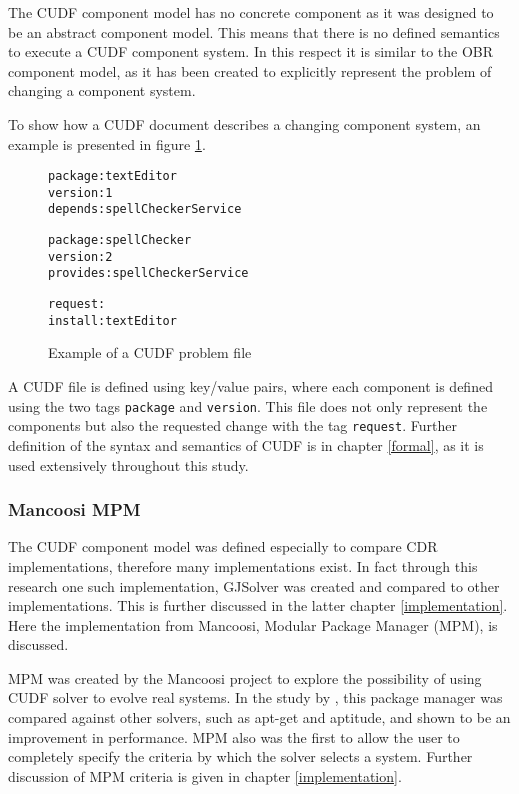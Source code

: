 The CUDF component model has no concrete component as it was designed to be an abstract component model.
This means that there is no defined semantics to execute a CUDF component system.
In this respect it is similar to the OBR component model, as it has been created to explicitly represent the problem of changing a component system.

To show how a CUDF document describes a changing component system, an example is presented in figure \ref{CUDFmetadata}.

\begin{figure}[htp] 
\begin{center}
\begin{alltt}
package: textEditor
version: 1
depends: spellCheckerService

package: spellChecker
version: 2
provides: spellCheckerService

request:
install:textEditor

\end{alltt}
  \caption[CUDF meta-data file]{Example of a CUDF problem file}
  \label{CUDFmetadata}
\end{center}
\end{figure}

A CUDF file is defined using key/value pairs, where each component is defined using the two tags \texttt{package} and \texttt{version}.
This file does not only represent the components but also the requested change with the tag \texttt{request}.
Further definition of the syntax and semantics of CUDF is in chapter \ref{formal}, as it is used extensively throughout this study.

\subsubsection{Mancoosi MPM}
The CUDF component model was defined especially to compare CDR implementations, therefore many implementations exist.
In fact through this research one such implementation, GJSolver was created and compared to other implementations.
This is further discussed in the latter chapter \ref{implementation}.
Here the implementation from Mancoosi, Modular Package Manager \citep{abate2011} (MPM), is discussed.

MPM was created by the Mancoosi project to explore the possibility of using CUDF solver to evolve real systems.
In the study by \cite{abate2011}, this package manager was compared against other solvers, such as apt-get and aptitude, and shown to be an improvement in performance.
MPM also was the first to allow the user to completely specify the criteria by which the solver selects a system.
Further discussion of MPM criteria is given in chapter \ref{implementation}. 

